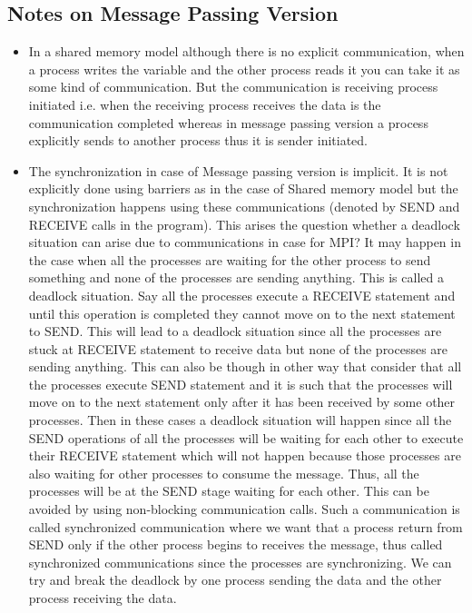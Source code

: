 \documentclass[12pt]{article}
\begin{document}
\subsection{Notes on Message Passing Version}
\begin{itemize}
    \item In a shared memory model although there is no explicit communication,
    when a process writes the variable and the other process reads it you can take it as some kind of communication. But the communication 
    is receiving process initiated i.e. when the receiving process receives the data is the communication completed whereas in message passing version
    a process explicitly sends to another process thus it is sender initiated. 
    \item The synchronization in case of Message passing version is implicit. It is not explicitly done using barriers as in the case of Shared memory model
    but the synchronization happens using these communications (denoted by SEND and RECEIVE calls in the program).
    This arises the question whether a deadlock situation can arise due to communications in case for MPI? It may happen in the case when all the processes are waiting for the other process to send something 
    and none of the processes are sending anything. This is called a deadlock situation. Say all the processes execute a RECEIVE statement and until this operation is completed they cannot move on to the next statement to SEND.
    This will lead to a deadlock situation since all the processes are stuck at RECEIVE statement to receive data but none of the processes are sending anything. This can also be though in other way that consider that all the processes execute SEND statement
    and it is such that the processes will move on to the next statement only after it has been received by some other processes. Then in these cases a deadlock situation will happen since all the SEND operations of all the processes will be waiting for each other 
    to execute their RECEIVE statement which will not happen because those processes are also waiting for other processes to consume the message. Thus, all the processes will be at the SEND stage waiting for each other.
    This can be avoided by using non-blocking communication calls. Such a communication is called synchronized communication where we want that a process return from SEND only if the other process begins to receives the message, thus called synchronized communications since the 
    processes are synchronizing. We can try and break the deadlock by one process sending the data and the other process receiving the data.

\end{itemize}
\end{document}
